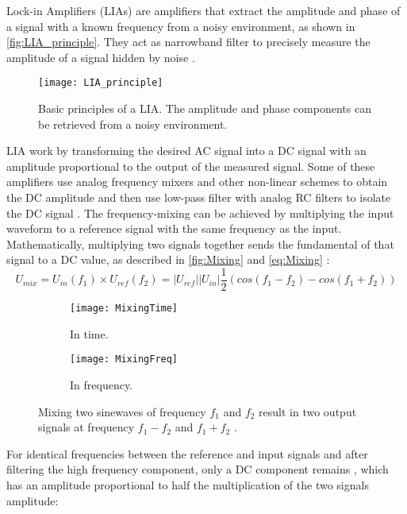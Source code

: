 Lock-in Amplifiers (LIAs) are amplifiers that extract the amplitude and phase of a signal with a known frequency from a noisy environment, as shown in \autoref{fig:LIA_principle}. They act as narrowband filter to precisely measure the amplitude of a signal hidden by noise \cite{Carminati2017,horowitz1989art}. \par 

\begin{figure}[ht]
    \centering
    \texttt{[image: LIA\_principle]}
    \caption{Basic principles of a LIA. The amplitude and phase components can be retrieved from a noisy environment.}
    \label{fig:LIA_principle}
\end{figure}
LIA work by transforming the desired AC signal into a DC signal with an amplitude proportional to the output of the measured signal. Some of these amplifiers use analog frequency mixers and other non-linear schemes to obtain the DC amplitude and then use low-pass filter with analog RC filters \cite{horowitz1989art} to isolate the DC signal \cite{Carminati2017}. The frequency-mixing can be achieved by multiplying the input waveform to a reference signal with the same frequency as the input. Mathematically, multiplying two signals together sends the fundamental of that signal to a DC value, as described in \autoref{fig:Mixing} and \autoref{eq:Mixing} :
\begin{equation}
\label{eq:Mixing}
   U_{mix} = U_{in}(f_1) \times U_{ref}(f_2) = \lvert U_{ref} \rvert \lvert U_{in} \rvert \frac{1}{2} (cos(f_1 - f_2) - cos(f_1 + f_2))
\end{equation}
\begin{figure}[ht]
\centering
\begin{subfigure}{0.35\textwidth}
\centering
    \texttt{[image: MixingTime]}
    \caption{In time.}
\end{subfigure}
\begin{subfigure}{0.64\textwidth}
\centering
    \texttt{[image: MixingFreq]}
    \caption{In frequency.}
\end{subfigure}
\caption{Mixing two sinewaves of frequency $f_1$ and $f_2$ result in two output signals at frequency $f_1-f_2$ and $f_1 + f_2$ \citep{poole_2020}.}
\label{fig:Mixing}
\end{figure}
For identical frequencies between the reference and input signals and after filtering the high frequency component, only a DC component remains \cite{Carminati2017}, which has an amplitude proportional to half the multiplication of the two signals amplitude: 
